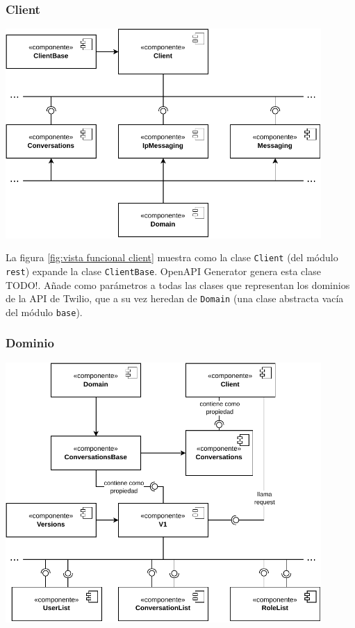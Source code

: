 \documentclass{article}
\begin{document}
\subsubsection{Client}

\hfill

\begin{center}
  \includegraphics[width=0.9\textwidth]{VistaFuncionalCliente.pdf}
  \label{fig:vista funcional client}
\end{center}

\hfill

La figura \ref{fig:vista funcional client}
muestra como la clase \verb|Client|
(del módulo \verb|rest|)
expande la clase \verb|ClientBase|.
OpenAPI Generator genera esta clase
\cite{twilio-generated-openapi} TODO!.
Añade como parámetros a todas las clases
que representan los dominios de la API de Twilio,
que a su vez heredan de \verb|Domain|
(una clase abstracta vacía del módulo \verb|base|).

\subsubsection{Dominio}

\hfill

\begin{center}
  \includegraphics[width=0.9\textwidth]{VistaFuncionalDominio.pdf}
  \label{fig:vista funcional dominio}
\end{center}
\end{document}
